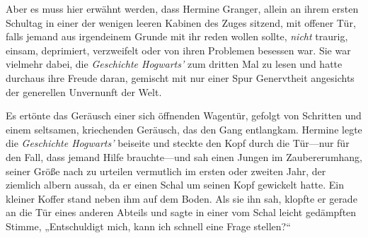 Aber es muss hier erwähnt werden, dass Hermine Granger, allein an ihrem ersten Schultag in einer der wenigen leeren Kabinen des Zuges sitzend, mit offener Tür, falls jemand aus irgendeinem Grunde mit ihr reden wollen sollte, \emph{nicht} traurig, einsam, deprimiert, verzweifelt oder von ihren Problemen besessen war. Sie war vielmehr dabei, die \emph{Geschichte Hogwarts’} zum dritten Mal zu lesen und hatte durchaus ihre Freude daran, gemischt mit nur einer Spur Genervtheit angesichts der generellen Unvernunft der Welt.

Es ertönte das Geräusch einer sich öffnenden Wagentür, gefolgt von Schritten und einem seltsamen, kriechenden Geräusch, das den Gang entlangkam. Hermine legte die \emph{Geschichte Hogwarts’} beiseite und steckte den Kopf durch die Tür—nur für den Fall, dass jemand Hilfe brauchte—und sah einen Jungen im Zaubererumhang, seiner Größe nach zu urteilen vermutlich im ersten oder zweiten Jahr, der ziemlich albern aussah, da er einen Schal um seinen Kopf gewickelt hatte. Ein kleiner Koffer stand neben ihm auf dem Boden. Als sie ihn sah, klopfte er gerade an die Tür eines anderen Abteils und sagte in einer vom Schal leicht gedämpften Stimme, „Entschuldigt mich, kann ich schnell eine Frage stellen?“

